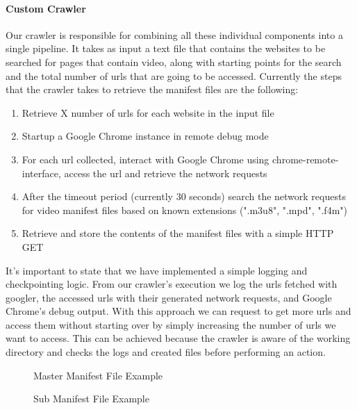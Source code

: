 \documentclass[]{sig-alternate-10pt}
\begin{document}
\hypertarget{custom-crawler}{%
\paragraph{Custom Crawler}\label{custom-crawler}}

Our crawler is responsible for combining all these individual components
into a single pipeline. It takes as input a text file that contains the
websites to be searched for pages that contain video, along with
starting points for the search and the total number of urls that are
going to be accessed. Currently the steps that the crawler takes to
retrieve the manifest files are the following:

\begin{enumerate}
\item Retrieve X number of urls for each website in the input file
\item Startup a Google Chrome instance in remote debug mode
\item For each url collected, interact with Google Chrome using chrome-remote-interface, access the url and retrieve the network requests
\item After the timeout period (currently 30 seconds) search the network requests for video manifest files based on known extensions (".m3u8", ".mpd", ".f4m")
\item Retrieve and store the contents of the manifest files with a simple HTTP GET
\end{enumerate}

It's important to state that we have implemented a simple logging and
checkpointing logic. From our crawler's execution we log the urls
fetched with googler, the accessed urls with their generated network
requests, and Google Chrome's debug output. With this approach we can
request to get more urls and access them without starting over by simply
increasing the number of urls we want to access. This can be achieved
because the crawler is aware of the working directory and checks the
logs and created files before performing an action.

\begin{figure}
\centering
{}
\caption{Master Manifest File Example}
\end{figure}
\begin{figure}
\centering
{}
\caption{Sub Manifest File Example}
\end{figure}
\end{document}
